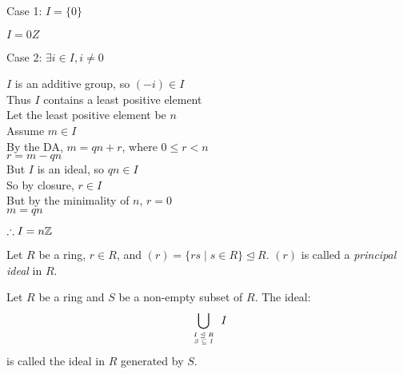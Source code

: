 \documentclass[letterpaper,12pt,fleqn]{article}
\newcommand{\ide}{\trianglelefteq}
\begin{document}
\begin{theproof}
  \listbreak
  \begin{description}
  \item Case 1: $I=\{0\}$

    $I=0Z$

  \item Case 2: $\exists i\in I,i\ne0$

    $I$ is an additive group, so $(-i)\in I$ \\
    Thus $I$ contains a least positive element \\
    Let the least positive element be $n$ \\
    Assume $m\in I$ \\
    By the DA, $m=qn+r$, where $0\le r<n$ \\
    $r=m-qn$ \\
    But $I$ is an ideal, so $qn\in I$ \\
    So by closure, $r\in I$ \\
    But by the minimality of $n$, $r=0$ \\
    $m=qn$

    $\therefore I=n\mathbb{Z}$

  \end{description}
\end{theproof}

\begin{definition}
  Let $R$ be a ring, $r\in R$, and $(r)=\{rs\mid s\in R\}\ide R$. $(r)$ is called a
  \emph{principal ideal} in $R$.
\end{definition}

\begin{definition}
  Let $R$ be a ring and $S$ be a non-empty subset of $R$. The ideal:
  \[\bigcup_{\tiny{\begin{array}{c}I\ide R \\ S\subseteq I\end{array}}}I\]
  is called the ideal in $R$ generated by $S$.
\end{definition}
\end{document}
